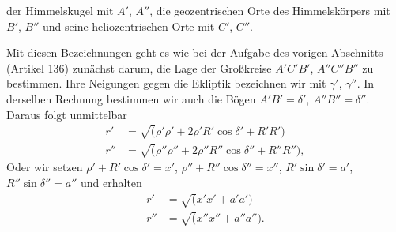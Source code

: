 der Himmelskugel mit $A'$, $A''$, die geozentrischen Orte des Himmelskörpers
mit $B'$, $B''$ und seine heliozentrischen Orte mit $C'$, $C''$.
\par
Mit diesen Bezeichnungen geht es wie bei der Aufgabe des vorigen Abschnitts
(Artikel 136) zunächst darum, die Lage der Großkreise $A'C'B'$,
$A''C''B''$ zu bestimmen. Ihre Neigungen gegen die Ekliptik bezeichnen wir mit $\gamma'$, $\gamma''$. In derselben
Rechnung bestimmen wir auch die Bögen $A'B'=\delta'$, $A''B''=\delta''$. Daraus
folgt unmittelbar
\[
\begin{aligned}
r'&=\surd(\rho'\rho'+2\rho'R'\cos\delta'+R'R')\\
r''&=\surd(\rho''\rho''+2\rho''R''\cos\delta''+R''R''),
\end{aligned}
\]
\noindent Oder wir setzen $\rho'+R'\cos\delta'=x'$, $\rho''+R''\cos\delta''=x''$,
$R'\sin\delta'=a'$, $R''\sin\delta''=a''$ und erhalten
\[
\begin{aligned}
r'&=\surd(x'x'+a'a')\\
r''&=\surd(x''x''+a''a'').
\end{aligned}
\]
